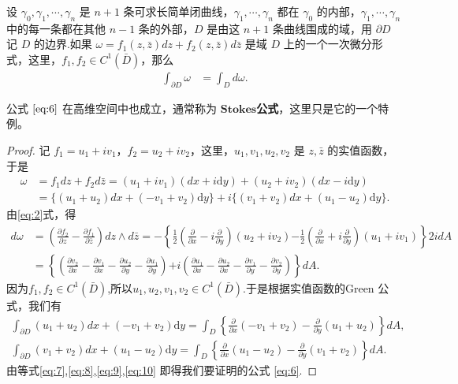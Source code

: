 \documentclass[../../main.tex]{subfiles}
\begin{document}
\begin{theorem}[Green公式]\label{theorem:Green公式-复变函数形式}
设 \( \gamma_0, \gamma_1, \cdots, \gamma_n \) 是 \( n + 1 \) 条可求长简单闭曲线，\( \gamma_1, \cdots, \gamma_n \) 都在 \( \gamma_0 \) 的内部，\( \gamma_1, \cdots, \gamma_n \) 中的每一条都在其他 \( n - 1 \) 条的外部，\( D \) 是由这 \( n + 1 \) 条曲线围成的域，用 \(\partial D \) 记 \( D \) 的边界.如果 \( \omega = f_1(z,\bar{z})dz + f_2(z,\bar{z})d\bar{z} \) 是域 \( D \) 上的一个一次微分形式，这里，\( f_1,f_2 \in C^1(\bar{D}) \)，那么
\begin{align}
\int_{\partial D} \omega &= \int_D d\omega. \label{eq:6}
\end{align}
\end{theorem}
\begin{note}
公式 \(\eqref{eq:6}\) 在高维空间中也成立，通常称为 $\mathbf{Stokes}$\textbf{公式}，这里只是它的一个特例。
\end{note}
\begin{proof}
记 \( f_1 = u_1 + iv_1 \)，\( f_2 = u_2 + iv_2 \)，这里，\( u_1,v_1,u_2,v_2 \) 是 \( z,\bar{z} \) 的实值函数，于是
\begin{align}\label{eq:7}
\omega &= f_1 dz + f_2 d\bar{z} = (u_1 + iv_1)(dx + i\mathrm{d}y) + (u_2 + iv_2)(dx - i\mathrm{d}y) \nonumber \\
&= \{(u_1 + u_2)dx + (-v_1 + v_2)\mathrm{d}y\}+ i\{(v_1 + v_2)dx + (u_1 - u_2)\mathrm{d}y\}.
\end{align}
由\eqref{eq:2}式，得
\begin{align}
d\omega &= \left( \frac{\partial f_2}{\partial z} - \frac{\partial f_1}{\partial \bar{z}} \right) dz \wedge d\bar{z} = -\left\{ \frac{1}{2} \left( \frac{\partial}{\partial x} - i \frac{\partial}{\partial y} \right)(u_2 + iv_2) \right. \left. - \frac{1}{2} \left( \frac{\partial}{\partial x} + i \frac{\partial}{\partial y} \right)(u_1 + iv_1) \right\} 2idA \nonumber \\
&= \left\{ \left( \frac{\partial v_2}{\partial x} - \frac{\partial v_1}{\partial x} - \frac{\partial u_2}{\partial y} - \frac{\partial u_1}{\partial y} \right) \right. \left. + i \left( \frac{\partial u_1}{\partial x} - \frac{\partial u_2}{\partial x} - \frac{\partial v_1}{\partial y} - \frac{\partial v_2}{\partial y} \right) \right\} dA. \label{eq:8}
\end{align}
因为\( f_1,f_2 \in C^1(\bar{D}) \),所以$u_1,u_2,v_1,v_2\in C^1(\bar{D})$.于是根据实值函数的Green 公式，我们有
\begin{gather}
\int_{\partial D} (u_1 + u_2)dx + (-v_1 + v_2)\mathrm{d}y = \int_D \left\{ \frac{\partial}{\partial x}(-v_1 + v_2) - \frac{\partial}{\partial y}(u_1 + u_2) \right\} dA, \label{eq:9}
\\
\int_{\partial D} (v_1 + v_2)dx + (u_1 - u_2)\mathrm{d}y = \int_D \left\{ \frac{\partial}{\partial x}(u_1 - u_2) - \frac{\partial}{\partial y}(v_1 + v_2) \right\} dA. \label{eq:10}
\end{gather}
由等式\eqref{eq:7},\eqref{eq:8},\eqref{eq:9},\eqref{eq:10} 即得我们要证明的公式 \eqref{eq:6}.
\end{proof}
\end{document}
